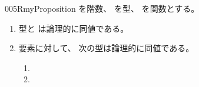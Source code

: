 \documentclass[index]{subfiles}
\begin{document}
\begin{myBlock}{005R}{myProposition}
  を階数、
  を型、
  を関数とする。
  \begin{enumerate}
  \item \label{005R:0000}
    型と
    は論理的に同値である。
  \item \label{005R:0001}
    要素に対して、
    次の型は論理的に同値である。
    \begin{enumerate}
    \item {}
    \item {}
    \end{enumerate}
  \end{enumerate}
\end{myBlock}
\StartDefiningTabulars
\end{document}

